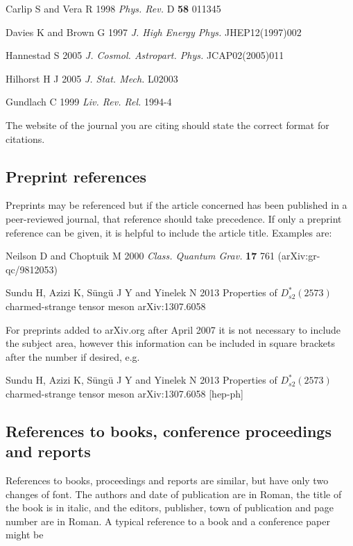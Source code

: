 \documentclass[12pt]{iopart}
\begin{document}
\item Carlip S and Vera R 1998 {\it Phys. Rev.} D {\bf 58} 011345 
\item Davies K and Brown G 1997 {\it J. High Energy Phys.} JHEP12(1997)002
\item Hannestad S 2005 {\it J. Cosmol. Astropart. Phys.} JCAP02(2005)011
\item Hilhorst H J 2005 {\it J. Stat. Mech.} L02003
\item Gundlach C 1999 {\it Liv. Rev. Rel.} 1994-4
\endnumrefs

\noindent The website of the journal you are citing should state the correct format for citations.

\subsection{Preprint references}
Preprints may be referenced but if the article concerned has been published in a peer-reviewed journal, that reference should take precedence. If only a preprint reference can be given, it is helpful to include the article title. Examples are:
\vskip6pt
\item Neilson D and Choptuik M 2000 {\it Class. Quantum Grav.} {\bf 17} 761 (arXiv:gr-qc/9812053)
\item Sundu H, Azizi K, S\"ung\"u J Y and Yinelek N 2013 Properties of $D_{s2}^*(2573)$ charmed-strange tensor meson arXiv:1307.6058
\endnumrefs

\noindent For preprints added to arXiv.org after April 2007 it is not necessary to include the subject area, however this information can be included in square brackets after the number if desired, e.g.
\item Sundu H, Azizi K, S\"ung\"u J Y and Yinelek N 2013 Properties of $D_{s2}^*(2573)$ charmed-strange tensor meson arXiv:1307.6058 [hep-ph]
\endnumrefs

\subsection{References to books, conference proceedings and reports}

References to books, proceedings and reports are similar, but have only two
changes of font. The authors and date of publication are in Roman, the 
title of the book is in italic, and the editors, publisher, 
town of publication 
and page number are in Roman. A typical reference to a book and a
conference paper might be
\end{document}
